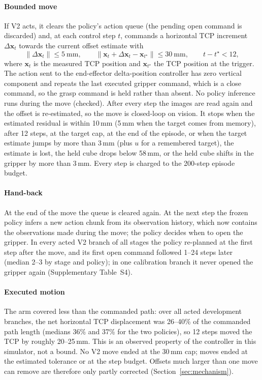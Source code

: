 \paragraph{Bounded move} If V2 acts, it clears the policy's action queue (the pending open command is discarded) and, at each control step $t$, commands a horizontal TCP increment $\Delta\mathbf{x}_t$ towards the current offset estimate with
\begin{equation}
\|\Delta\mathbf{x}_t\|\le 5\ \mathrm{mm},\qquad \|\mathbf{x}_t+\Delta\mathbf{x}_t-\mathbf{x}_{t^\star}\|\le 30\ \mathrm{mm},\qquad t-t^\star< 12,
\end{equation}
where $\mathbf{x}_t$ is the measured TCP position and $\mathbf{x}_{t^\star}$ the TCP position at the trigger. The action sent to the end-effector delta-position controller has zero vertical component and repeats the last executed gripper command, which is a close command, so the grasp command is held rather than absent. No policy inference runs during the move (checked). After every step the images are read again and the offset is re-estimated, so the move is closed-loop on vision. It stops when the estimated residual is within 10\,mm (5\,mm when the target comes from memory), after 12 steps, at the target cap, at the end of the episode, or when the target estimate jumps by more than 3\,mm (plus $u$ for a remembered target), the estimate is lost, the held cube drops below 58\,mm, or the held cube shifts in the gripper by more than 3\,mm. Every step is charged to the 200-step episode budget.

\paragraph{Hand-back} At the end of the move the queue is cleared again. At the next step the frozen policy infers a new action chunk from its observation history, which now contains the observations made during the move; the policy decides when to open the gripper. In every acted V2 branch of all stages the policy re-planned at the first step after the move, and its first open command followed 1--24 steps later (median 2--3 by stage and policy); in one calibration branch it never opened the gripper again (Supplementary Table~S4).

\paragraph{Executed motion} The arm covered less than the commanded path: over all acted development branches, the net horizontal TCP displacement was 26--40\% of the commanded path length (medians 36\% and 37\% for the two policies), so 12 steps moved the TCP by roughly 20--25\,mm. This is an observed property of the controller in this simulator, not a bound. No V2 move ended at the 30\,mm cap; moves ended at the estimated tolerance or at the step budget. Offsets much larger than one move can remove are therefore only partly corrected (Section~\ref{sec:mechanism}).

